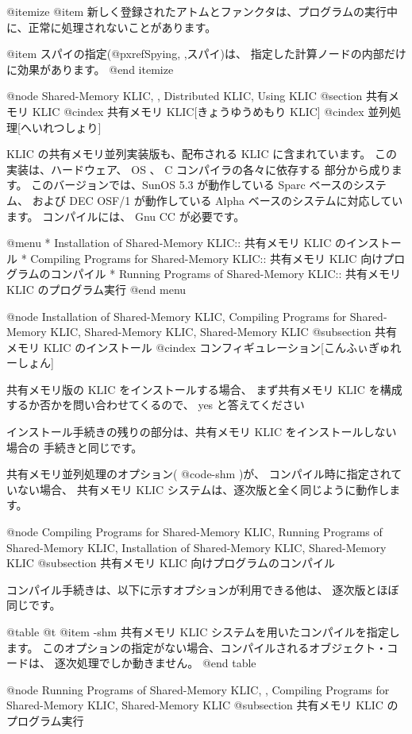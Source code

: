 {{{{@itemize
@item
新しく登録されたアトムとファンクタは、プログラムの実行中に、正常に処理されないことがあります。

@item
スパイの指定(@pxref{Spying, ,スパイ})は、
指定した計算ノードの内部だけに効果があります。
@end itemize

@node Shared-Memory KLIC,  , Distributed KLIC, Using KLIC
@section 共有メモリ KLIC
@cindex 共有メモリ KLIC[きょうゆうめもり KLIC]
@cindex 並列処理[へいれつしょり]

KLIC の共有メモリ並列実装版も、配布される KLIC に含まれています。
この実装は、ハードウェア、 OS 、 C コンパイラの各々に依存する
部分から成ります。
このバージョンでは、SunOS 5.3 が動作している Sparc ベースのシステム、
および DEC OSF/1 が動作している Alpha ベースのシステムに対応しています。
コンパイルには、 Gnu CC が必要です。

@menu
* Installation of Shared-Memory KLIC::          共有メモリ KLIC のインストール
* Compiling Programs for Shared-Memory KLIC::   共有メモリ KLIC 向けプログラムのコンパイル
* Running Programs of Shared-Memory KLIC::      共有メモリ KLIC のプログラム実行
@end menu

@node Installation of Shared-Memory KLIC, Compiling Programs for Shared-Memory KLIC, Shared-Memory KLIC, Shared-Memory KLIC
@subsection 共有メモリ KLIC のインストール
@cindex コンフィギュレーション[こんふぃぎゅれーしょん]

共有メモリ版の KLIC をインストールする場合、
まず共有メモリ KLIC を構成するか否かを問い合わせてくるので、
 yes と答えてください

インストール手続きの残りの部分は、共有メモリ KLIC をインストールしない場合の
手続きと同じです。

共有メモリ並列処理のオプション( @code{-shm} )が、
コンパイル時に指定されていない場合、
共有メモリ KLIC システムは、逐次版と全く同じように動作します。

@node Compiling Programs for Shared-Memory KLIC, Running Programs of Shared-Memory KLIC, Installation of Shared-Memory KLIC, Shared-Memory KLIC
@subsection 共有メモリ KLIC 向けプログラムのコンパイル

コンパイル手続きは、以下に示すオプションが利用できる他は、
逐次版とほぼ同じです。

@table @t
@item -shm
共有メモリ KLIC システムを用いたコンパイルを指定します。
このオプションの指定がない場合、コンパイルされるオブジェクト・コードは、
逐次処理でしか動きません。
@end table

@node Running Programs of Shared-Memory KLIC,  , Compiling Programs for Shared-Memory KLIC, Shared-Memory KLIC
@subsection 共有メモリ KLIC のプログラム実行

}}}}
